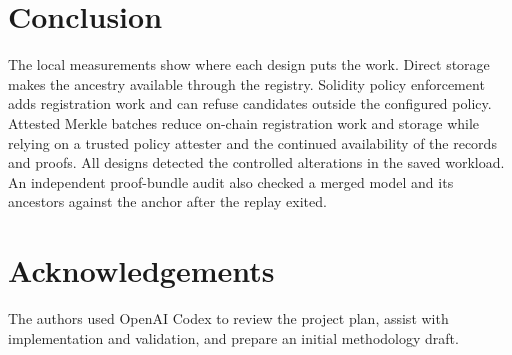 \documentclass[conference]{IEEEtran}
\begin{document}
\section{Conclusion}
The local measurements show where each design puts the work. Direct
storage makes the ancestry available through the registry. Solidity
policy enforcement adds registration work and can refuse candidates
outside the configured policy. Attested Merkle batches reduce on-chain
registration work and storage while relying on a trusted policy
attester and the continued availability of the records and proofs.
All designs detected the controlled alterations in the saved workload.
An independent proof-bundle audit also checked a merged model and its
ancestors against the anchor after the replay exited.

\section*{Acknowledgements}
The authors used OpenAI Codex to review the project plan, assist with
implementation and validation, and prepare an initial methodology draft.
\end{document}
